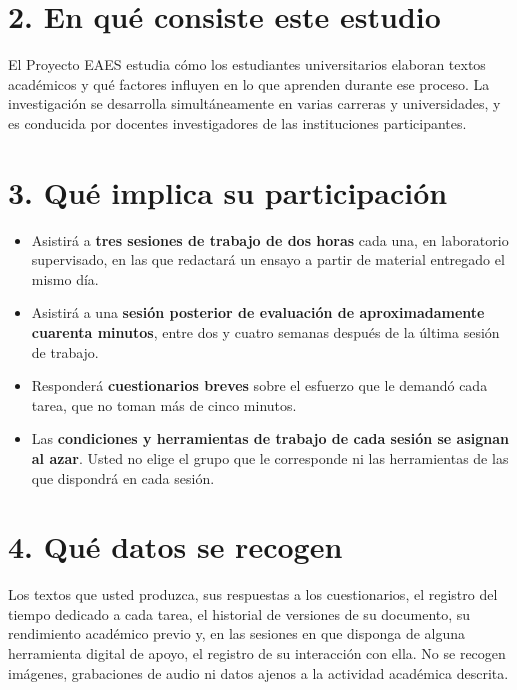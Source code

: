\documentclass[12pt,a4paper,openany]{report}
\begin{document}
    \section*{2. En qu\'e consiste este estudio}
    
    El Proyecto EAES estudia c\'omo los estudiantes universitarios elaboran textos acad\'emicos y qu\'e factores influyen en lo que aprenden durante ese proceso. La investigaci\'on se desarrolla simult\'aneamente en varias carreras y universidades, y es conducida por docentes investigadores de las instituciones participantes.
    
    \section*{3. Qu\'e implica su participaci\'on}
    
    \begin{itemize}[leftmargin=1.0cm]
        \item Asistir\'a a \textbf{tres sesiones de trabajo de dos horas} cada una, en laboratorio supervisado, en las que redactar\'a un ensayo a partir de material entregado el mismo d\'ia.
        \item Asistir\'a a una \textbf{sesi\'on posterior de evaluaci\'on de aproximadamente cuarenta minutos}, entre dos y cuatro semanas despu\'es de la \'ultima sesi\'on de trabajo.
        \item Responder\'a \textbf{cuestionarios breves} sobre el esfuerzo que le demand\'o cada tarea, que no toman m\'as de cinco minutos.
        \item Las \textbf{condiciones y herramientas de trabajo de cada sesi\'on se asignan al azar}. Usted no elige el grupo que le corresponde ni las herramientas de las que dispondr\'a en cada sesi\'on.
    \end{itemize}
    
    \section*{4. Qu\'e datos se recogen}
    
    Los textos que usted produzca, sus respuestas a los cuestionarios, el registro del tiempo dedicado a cada tarea, el historial de versiones de su documento, su rendimiento acad\'emico previo y, en las sesiones en que disponga de alguna herramienta digital de apoyo, el registro de su interacci\'on con ella. No se recogen im\'agenes, grabaciones de audio ni datos ajenos a la actividad acad\'emica descrita.
    
\end{document}
